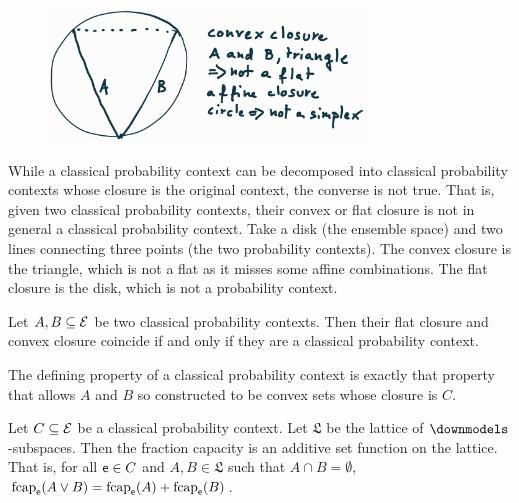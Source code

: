 \begin{figure}[h]
	\centering
	\includegraphics[width=0.75\textwidth]{tempimages/ContextClosureNotContext.jpg}
\end{figure}

\begin{remark}
	While a classical probability context can be decomposed into classical probability contexts whose closure is the original context, the converse is not true. That is, given two classical probability contexts, their convex or flat closure is not in general a classical probability context. Take a disk (the ensemble space) and two lines connecting three points (the two probability contexts). The convex closure is the triangle, which is not a flat as it misses some affine combinations. The flat closure is the disk, which is not a probability context.
\end{remark}

\begin{conj}
	Let $A, B \subseteq \mathcal{E}$ be two classical probability contexts. Then their flat closure and convex closure coincide if and only if they are a classical probability context.
\end{conj}

\begin{conj}
	The defining property of a classical probability context is exactly that property that allows $A$ and $B$ so constructed to be convex sets whose closure is $C$.
\end{conj}

\begin{prop}
	Let $C \subseteq \mathcal{E}$ be a classical probability context. Let $\mathfrak{L}$ be the lattice of $\separate$-subspaces. Then the fraction capacity is an additive set function on the lattice. That is, for all $\mathsf{e} \in C$ and $A, B \in \mathfrak{L}$ such that $A \cap B = \emptyset$,  $\mathrm{fcap}_{\mathsf{e}}(A \vee B) = \mathrm{fcap}_{\mathsf{e}}(A) + \mathrm{fcap}_{\mathsf{e}}(B)$.
\end{prop}

